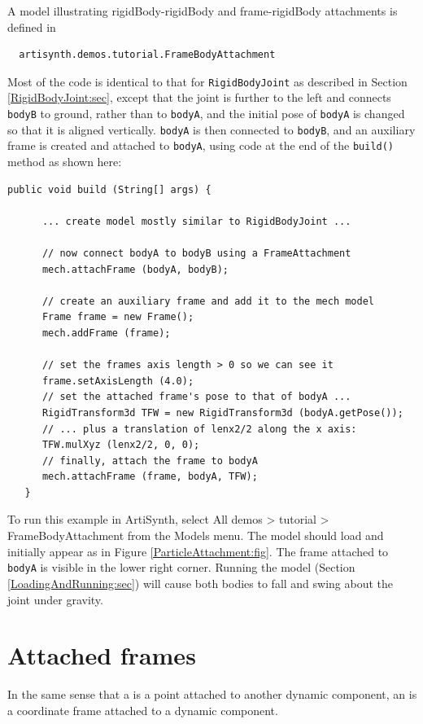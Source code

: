 A model illustrating rigidBody-rigidBody and frame-rigidBody attachments
is defined in
%
\begin{verbatim}
  artisynth.demos.tutorial.FrameBodyAttachment
\end{verbatim}
%
Most of the code is identical to that for {\tt RigidBodyJoint}
as described in Section \ref{RigidBodyJoint:sec}, except that
the joint is further to the left and connects {\tt bodyB} to ground,
rather than to {\tt bodyA}, and the initial pose of {\tt bodyA}
is changed so that it is aligned vertically. {\tt bodyA} is
then connected to {\tt bodyB}, and an auxiliary frame is created
and attached to {\tt bodyA}, using code at the end
of the {\tt build()} method as shown here:
%
\lstset{numbers=left}
\begin{lstlisting}[]
   public void build (String[] args) {

      ... create model mostly similar to RigidBodyJoint ...

      // now connect bodyA to bodyB using a FrameAttachment
      mech.attachFrame (bodyA, bodyB);

      // create an auxiliary frame and add it to the mech model
      Frame frame = new Frame();
      mech.addFrame (frame);
      
      // set the frames axis length > 0 so we can see it
      frame.setAxisLength (4.0); 
      // set the attached frame's pose to that of bodyA ...
      RigidTransform3d TFW = new RigidTransform3d (bodyA.getPose());
      // ... plus a translation of lenx2/2 along the x axis:
      TFW.mulXyz (lenx2/2, 0, 0);
      // finally, attach the frame to bodyA
      mech.attachFrame (frame, bodyA, TFW);
   }
\end{lstlisting}
\lstset{numbers=none}
%
To run this example in ArtiSynth, select {\sf All demos > tutorial >
FrameBodyAttachment} from the {\sf Models} menu. The model should load
and initially appear as in Figure \ref{ParticleAttachment:fig}.  The
frame attached to {\tt bodyA} is visible in the lower right corner.
Running the model (Section \ref{LoadingAndRunning:sec}) will cause
both bodies to fall and swing about the joint under gravity.

\section{Attached frames}
\label{attachedFrames:sec}

In the same sense that a  is a point attached to
another dynamic component, an  is a
coordinate frame attached to a dynamic component.

